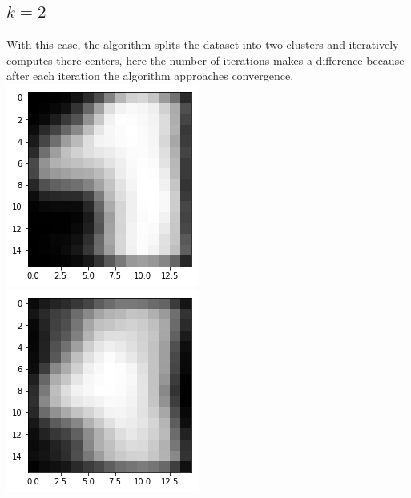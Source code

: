 \documentclass{article}
\begin{document}
\subsection{$k = 2$}
With this case, the algorithm splits the dataset into two clusters and iteratively computes there centers, here the number of iterations makes a difference because after each iteration the algorithm approaches convergence. \\
\includegraphics{k_2_1.png} \\
\includegraphics{k_2_2.png} \\
\end{document}
